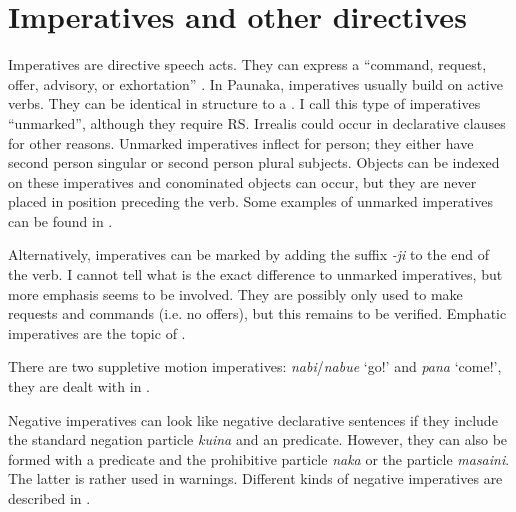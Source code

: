 
\section{Imperatives and other directives}\label{sec:Imperative}

Imperatives are directive speech acts. They can express a “command, request, offer, advisory, or exhortation” \citep[277]{Koenig2007}. In Paunaka, imperatives usually build on active verbs. They can be identical in structure to a . I call this type of imperatives “unmarked”, although they require  RS. Irrealis could occur in declarative clauses for other reasons. Unmarked imperatives inflect for person; they either have second person singular or second person plural subjects. Objects can be indexed on these imperatives and conominated objects can occur, but they are never placed in  position preceding the verb.  Some examples of unmarked imperatives can be found in . %

Alternatively, imperatives can be marked by adding the suffix \textit{-ji} to the end of the verb. I cannot tell what is the exact difference to unmarked imperatives, but more emphasis seems to be involved. They are possibly only used to make requests and commands (i.e. no offers), but this remains to be verified. Emphatic imperatives are the topic of . 

There are two suppletive motion imperatives: \textit{nabi}/\textit{nabue} ‘go!’ and \textit{pana} ‘come!’, they are dealt with in . 

Negative imperatives can look like negative declarative sentences if they include the standard negation particle \textit{kuina} and an  predicate. However, they can also be formed with a  predicate and the prohibitive particle \textit{naka} or the  particle \textit{masaini}. The latter is rather used in warnings. Different kinds of negative imperatives are described in .

